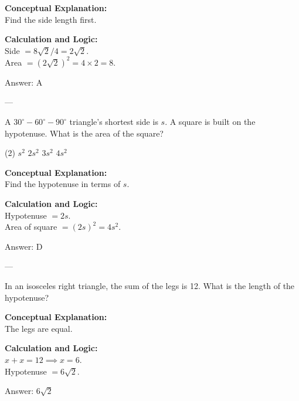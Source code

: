 \documentclass[11pt,paper=a4,answers]{exam}
\begin{document}
\begin{questions}
\begin{solution}
\textbf{Conceptual Explanation:} \\
Find the side length first.

\vspace{10pt}
\textbf{Calculation and Logic:} \\
Side $= 8\sqrt{2} / 4 = 2\sqrt{2}$. \\
Area $= (2\sqrt{2})^2 = 4 \times 2 = 8$.

\vspace{15pt}
Answer: \colorbox{yellow!100}{A}
\end{solution}

---

\question
A $30^\circ-60^\circ-90^\circ$ triangle's shortest side is $s$. A square is built on the hypotenuse. What is the area of the square?
\begin{tasks}(2)
    \task $s^2$
    \task $2s^2$
    \task $3s^2$
    \task $4s^2$
\end{tasks}

\begin{solution}
\textbf{Conceptual Explanation:} \\
Find the hypotenuse in terms of $s$.

\vspace{10pt}
\textbf{Calculation and Logic:} \\
Hypotenuse $= 2s$. \\
Area of square $= (2s)^2 = 4s^2$.

\vspace{15pt}
Answer: \colorbox{yellow!100}{D}
\end{solution}

---

\question
In an isosceles right triangle, the sum of the legs is 12. What is the length of the hypotenuse?

\begin{solution}
\textbf{Conceptual Explanation:} \\
The legs are equal.

\vspace{10pt}
\textbf{Calculation and Logic:} \\
$x + x = 12 \implies x = 6$. \\
Hypotenuse $= 6\sqrt{2}$.

\vspace{15pt}
Answer: \colorbox{yellow!100}{$6\sqrt{2}$}
\end{solution}


\end{questions}
\end{document}
